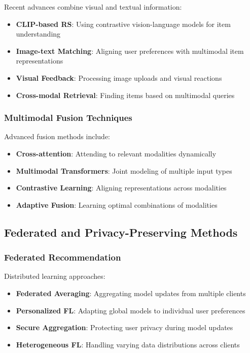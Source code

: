 Recent advances combine visual and textual information:
\begin{itemize}
    \item \textbf{CLIP-based RS}: Using contrastive vision-language models for item understanding
    \item \textbf{Image-text Matching}: Aligning user preferences with multimodal item representations
    \item \textbf{Visual Feedback}: Processing image uploads and visual reactions
    \item \textbf{Cross-modal Retrieval}: Finding items based on multimodal queries
\end{itemize}

\subsubsection{Multimodal Fusion Techniques}

Advanced fusion methods include:
\begin{itemize}
    \item \textbf{Cross-attention}: Attending to relevant modalities dynamically
    \item \textbf{Multimodal Transformers}: Joint modeling of multiple input types
    \item \textbf{Contrastive Learning}: Aligning representations across modalities
    \item \textbf{Adaptive Fusion}: Learning optimal combinations of modalities
\end{itemize}

\subsection{Federated and Privacy-Preserving Methods}

\subsubsection{Federated Recommendation}

Distributed learning approaches:
\begin{itemize}
    \item \textbf{Federated Averaging}: Aggregating model updates from multiple clients
    \item \textbf{Personalized FL}: Adapting global models to individual user preferences
    \item \textbf{Secure Aggregation}: Protecting user privacy during model updates
    \item \textbf{Heterogeneous FL}: Handling varying data distributions across clients
\end{itemize}

